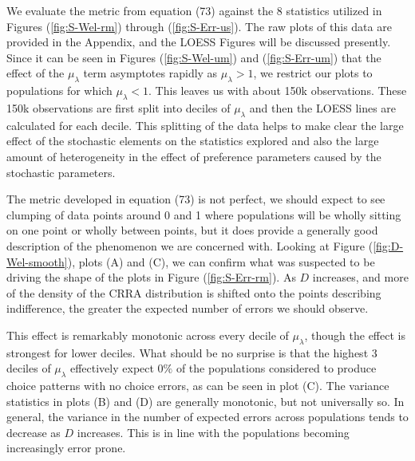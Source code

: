 \documentclass[11pt,a4paper]{report}
\begin{document}
We evaluate the metric from equation (73) against the 8 statistics utilized in Figures (\ref{fig:S-Wel-rm}) through (\ref{fig:S-Err-us}).
The raw plots of this data are provided in the Appendix, and the LOESS Figures will be discussed presently.
Since it can be seen in Figures (\ref{fig:S-Wel-um}) and (\ref{fig:S-Err-um}) that the effect of the $\mu_\lambda$ term asymptotes rapidly as $\mu_\lambda > 1$, we restrict our plots to populations for which $\mu_\lambda < 1$.
This leaves us with about 150k observations.
These 150k observations are first split into deciles of $\mu_\lambda$ and then the LOESS lines are calculated for each decile.
This splitting of the data helps to make clear the large effect of the stochastic elements on the statistics explored and also the large amount of heterogeneity in the effect of preference parameters caused by the stochastic parameters.

The metric developed in equation (73) is not perfect, we should expect to see clumping of data points around 0 and 1 where populations will be wholly sitting on one point or wholly between points, but it does provide a generally good description of the phenomenon we are concerned with.
Looking at Figure (\ref{fig:D-Wel-smooth}), plots (A) and (C), we can confirm what was suspected to be driving the shape of the plots in Figure (\ref{fig:S-Err-rm}).
As $D$ increases, and more of the density of the CRRA distribution is shifted onto the points describing indifference, the greater the expected number of errors we should observe.

This effect is remarkably monotonic across every decile of $\mu_\lambda$, though the effect is strongest for lower deciles.
What should be no surprise is that the highest 3 deciles of $\mu_\lambda$ effectively expect $0\%$ of the populations considered to produce choice patterns with no choice errors, as can be seen in plot (C).
The variance statistics in plots (B) and (D) are generally monotonic, but not universally so.
In general, the variance in the number of expected errors across populations tends to decrease as $D$ increases.
This is in line with the populations becoming increasingly error prone.
\end{document}
